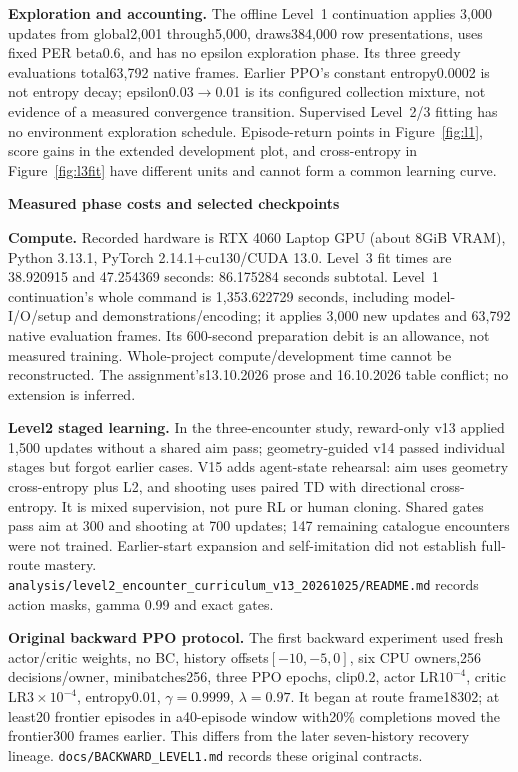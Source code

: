 \documentclass[11pt,a4paper]{article}
\newcommand{\topic}[2]{\vspace*{-4mm}{\small\color{teal}\textbf{#1}}\par{\LARGE\bfseries #2}\par\vspace{3mm}}
\newcommand{\pathref}[1]{\nolinkurl{#1}}
\begin{document}
\textbf{Exploration and accounting.} The offline Level~1 continuation applies 3,000 updates from global2,001 through5,000, draws384,000 row presentations, uses fixed PER beta0.6, and has no epsilon exploration phase. Its three greedy evaluations total63,792 native frames. Earlier PPO's constant entropy0.0002 is not entropy decay; epsilon0.03$\to$0.01 is its configured collection mixture, not evidence of a measured convergence transition. Supervised Level~2/3 fitting has no environment exploration schedule. Episode-return points in Figure~\ref{fig:l1}, score gains in the extended development plot, and cross-entropy in Figure~\ref{fig:l3fit} have different units and cannot form a common learning curve.

\newpage
\topic{APPENDIX C / COMPUTE AND IDENTITIES}{Measured phase costs and selected checkpoints}
\textbf{Compute.} Recorded hardware is RTX 4060 Laptop GPU (about 8GiB VRAM), Python 3.13.1, PyTorch 2.14.1+cu130/CUDA 13.0. Level~3 fit times are 38.920915 and 47.254369 seconds: 86.175284 seconds subtotal. Level~1 continuation's whole command is 1,353.622729 seconds, including model-I/O/setup and demonstrations/encoding; it applies 3,000 new updates and 63,792 native evaluation frames. Its 600-second preparation debit is an allowance, not measured training. Whole-project compute/development time cannot be reconstructed. The assignment's13.10.2026 prose and 16.10.2026 table conflict; no extension is inferred.


\textbf{Level2 staged learning.} In the three-encounter study, reward-only v13 applied 1,500 updates without a shared aim pass; geometry-guided v14 passed individual stages but forgot earlier cases. V15 adds agent-state rehearsal: aim uses geometry cross-entropy plus L2, and shooting uses paired TD with directional cross-entropy. It is mixed supervision, not pure RL or human cloning. Shared gates pass aim at 300 and shooting at 700 updates; 147 remaining catalogue encounters were not trained. Earlier-start expansion and self-imitation did not establish full-route mastery. \pathref{analysis/level2_encounter_curriculum_v13_20261025/README.md} records action masks, gamma 0.99 and exact gates.

\textbf{Original backward PPO protocol.} The first backward experiment used fresh actor/critic weights, no BC, history offsets$[-10,-5,0]$, six CPU owners,256 decisions/owner, minibatches256, three PPO epochs, clip0.2, actor LR$10^{-4}$, critic LR$3\times10^{-4}$, entropy0.01, $\gamma=0.9999$, $\lambda=0.97$. It began at route frame18302; at least20 frontier episodes in a40-episode window with20\% completions moved the frontier300 frames earlier. This differs from the later seven-history recovery lineage. \pathref{docs/BACKWARD_LEVEL1.md} records these original contracts.
\end{document}
